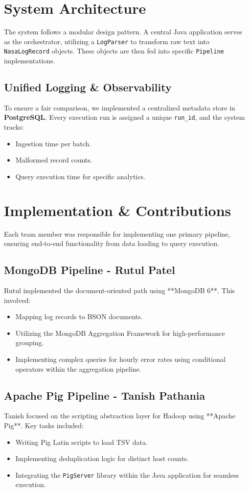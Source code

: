 \documentclass[a4paper,12pt]{article}
\begin{document}
\section{System Architecture}
The system follows a modular design pattern. A central Java application serves as the orchestrator, utilizing a \texttt{LogParser} to transform raw text into \texttt{NasaLogRecord} objects. These objects are then fed into specific \texttt{Pipeline} implementations.

\subsection{Unified Logging \& Observability}
To ensure a fair comparison, we implemented a centralized metadata store in \textbf{PostgreSQL}. Every execution run is assigned a unique \texttt{run\_id}, and the system tracks:
\begin{itemize}
    \item Ingestion time per batch.
    \item Malformed record counts.
    \item Query execution time for specific analytics.
\end{itemize}

\section{Implementation \& Contributions}
Each team member was responsible for implementing one primary pipeline, ensuring end-to-end functionality from data loading to query execution.

\subsection{MongoDB Pipeline - Rutul Patel}
Rutul implemented the document-oriented path using **MongoDB 6**. This involved:
\begin{itemize}
    \item Mapping log records to BSON documents.
    \item Utilizing the MongoDB Aggregation Framework for high-performance grouping.
    \item Implementing complex queries for hourly error rates using conditional operators within the aggregation pipeline.
\end{itemize}

\subsection{Apache Pig Pipeline - Tanish Pathania}
Tanish focused on the scripting abstraction layer for Hadoop using **Apache Pig**. Key tasks included:
\begin{itemize}
    \item Writing Pig Latin scripts to load TSV data.
    \item Implementing deduplication logic for distinct host counts.
    \item Integrating the \texttt{PigServer} library within the Java application for seamless execution.
\end{itemize}
\end{document}
